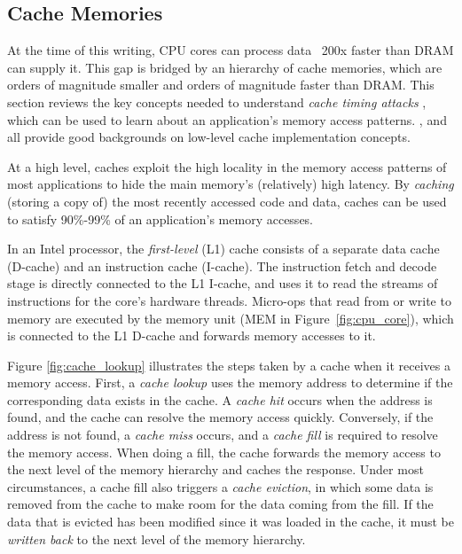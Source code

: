 \subsection{Cache Memories}
\label{sec:caching}

At the time of this writing, CPU cores can process data ~200x faster than DRAM
can supply it. This gap is bridged by an hierarchy of cache memories, which are
orders of magnitude smaller and orders of magnitude faster than DRAM. This
section reviews the key concepts needed to understand \textit{cache timing
attacks} \cite{banescu2011cache}, which can be used to learn about an
application's memory access patterns. \cite{smith1982cache},
\cite{patterson2013architecture} and \cite{hennessy2012architecture} all
provide good backgrounds on low-level cache implementation concepts.

At a high level, caches exploit the high locality in the memory access patterns
of most applications to hide the main memory's (relatively) high latency. By
\textit{caching} (storing a copy of) the most recently accessed code and data,
caches can be used to satisfy 90\%-99\% of an application's memory accesses.

In an Intel processor, the \textit{first-level} (L1) cache consists of a
separate data cache (D-cache) and an instruction cache (I-cache). The
instruction fetch and decode stage is directly connected to the L1 I-cache, and
uses it to read the streams of instructions for the core's hardware threads.
Micro-ops that read from or write to memory are executed by the memory unit
(MEM in Figure~\ref{fig:cpu_core}), which is connected to the L1 D-cache and
forwards memory accesses to it.

Figure \ref{fig:cache_lookup} illustrates the steps taken by a cache when it
receives a memory access. First, a \textit{cache lookup} uses the memory
address to determine if the corresponding data exists in the cache. A
\textit{cache hit} occurs when the address is found, and the cache can resolve
the memory access quickly. Conversely, if the address is not found, a
\textit{cache miss} occurs, and a \textit{cache fill} is required to resolve
the memory access. When doing a fill, the cache forwards the memory access to
the next level of the memory hierarchy and caches the response. Under most
circumstances, a cache fill also triggers a \textit{cache eviction}, in which
some data is removed from the cache to make room for the data coming from the
fill. If the data that is evicted has been modified since it was loaded in the
cache, it must be \textit{written back} to the next level of the memory
hierarchy.

